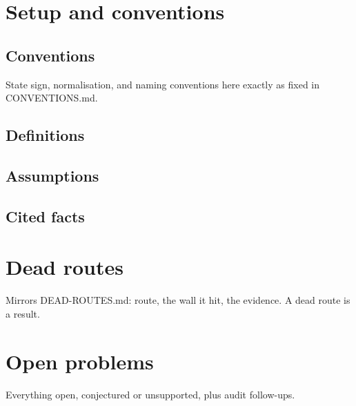 \section{Setup and conventions}\label{sec:setup}

\subsection{Conventions}
State sign, normalisation, and naming conventions here exactly as fixed in CONVENTIONS.md.

\subsection{Definitions}

\subsection{Assumptions}

\subsection{Cited facts}

\section{Dead routes}\label{sec:dead-routes}
Mirrors DEAD-ROUTES.md: route, the wall it hit, the evidence. A dead route is a result.

\section{Open problems}\label{sec:open}
Everything \textsf{open}, \textsf{conjectured} or \textsf{unsupported}, plus audit follow-ups.
